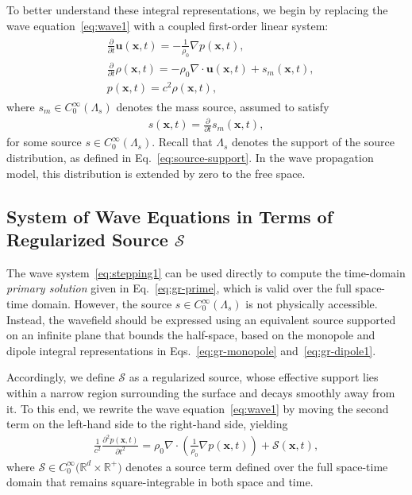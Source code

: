\documentclass[11pt,reqno]{amsart}
\theoremstyle{remark}
\theoremstyle{italic_lemma}
\newcommand{\bx}{\boldsymbol{x}}
\newcommand{\bu}{\boldsymbol{u}}
\begin{document}
\noindent
To better understand these integral representations, we begin by replacing the wave equation~\eqref{eq:wave1} with a coupled first-order linear system:
\begin{align}  
\label{eq:stepping1}
\begin{split}
    & \frac{\partial}{\partial t} \bu (\bx, t) = - \frac{1}{\rho_0} \nabla p(\bx, t),  \\
    & \frac{\partial}{\partial t} \rho(\bx,t) = - \rho_0 \nabla \cdot \bu (\bx, t) + s_m(\bx, t), \\
    & p(\bx, t) = c^2 \rho(\bx,t),
\end{split}
\end{align}
where \( s_m \in C_0^{\infty}(\Lambda_s) \) denotes the mass source, assumed to satisfy
\begin{align} \label{eq:mass-source}
s(\bx,t) = \frac{\partial }{\partial t} s_m(\bx,t),
\end{align}
for some source \( s \in C_0^{\infty}(\Lambda_s)  \). Recall that \( \Lambda_s \) denotes the support of the source distribution, as defined in Eq.~\eqref{eq:source-support}. In the wave propagation model, this distribution is extended by zero to the free space.


\subsection{System of Wave Equations in Terms of Regularized Source \( \mathcal{S} \)}
\label{sec:semi-num}

The wave system~\eqref{eq:stepping1} can be used directly to compute the time-domain \textit{primary solution} given in Eq.~\eqref{eq:gr-prime}, which is valid over the full space-time domain. However, the source \( s \in C_0^{\infty}(\Lambda_s) \) is not physically accessible. Instead, the wavefield should be expressed using an equivalent source supported on an infinite plane that bounds the half-space, based on the monopole and dipole integral representations in Eqs.~\eqref{eq:gr-monopole} and~\eqref{eq:gr-dipole1}.

\noindent
Accordingly, we define $\mathcal{S}$ as a regularized source, whose effective support lies within a narrow region surrounding the surface and decays smoothly away from it. To this end, we rewrite the wave equation~\eqref{eq:wave1} by moving the second term on the left-hand side to the right-hand side, yielding
\begin{align}  
\label{eq:wave3}
  \frac{1}{c^2} \frac{\partial^2 p (\bx, t)}{\partial t^2}
  = \rho_0 \nabla \cdot \left( \frac{1}{\rho_0} \nabla p(\bx, t) \right) 
  + \mathcal{S}(\bx, t),
\end{align}
where \( \mathcal{S} \in C_0^{\infty} \big( \mathbb{R}^d \times \mathbb{R}^+ \big) \) denotes a source term defined over the full space-time domain that remains square-integrable in both space and time. 
\end{document}
